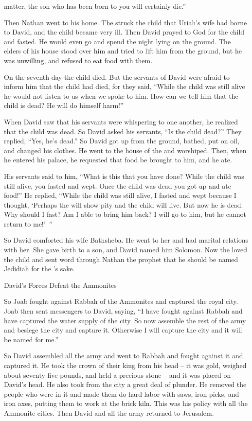 {matter,
the son
who has been born
to you will certainly
die.”
\par }{\PP {}Then Nathan
went
to
his home.
The
{}
struck
the child
that
Uriah’s
wife
had borne
to David,
and the child became very ill.
Then David
prayed
to God
for
the child
and fasted.
He
would even go
and spend
the night lying
on the ground.
The elders
of his house
stood
over
him and tried to lift
him from
the ground,
but he was unwilling,
and refused to eat food
with them.
\par }{\PP {}On
the seventh
day
the child
died.
But the servants
of David
were afraid
to inform
him that
the child
had
died,
for
they said,
“While
the child
was still alive
he would
not
listen
to us when
we spoke to him. How
can we tell
him
that the child
is dead? He will do
himself harm!”
\par }{\PP {}When David
saw
that
his servants
were whispering
to one another, he
realized
that the child
was dead.
So David
asked
his servants,
“Is the child
dead?” They replied,
“Yes, he’s dead.”
So David
got
up from the ground,
bathed,
put on oil,
and changed
his clothes.
He went
to the house
of the {}
and worshiped.
Then, when he entered
his palace,
he requested
that food
be brought to him,
and he ate.
\par }{\PP {}His servants
said
to him,
“What
is this
that
you have done? While
the child
was still alive,
you fasted
and wept.
Once the child
was dead
you got
up and ate
food!”
He replied,
“While
the child
was still alive,
I fasted
and wept
because
I
thought, ‘Perhaps
the {}
will show
pity
and the child
will live.
But now
he is dead.
Why
should I
fast? Am I
able
to bring him back? I
will go
to him,
but he cannot
return
to me!’ ”
\par }{\PP {}So David
comforted
his wife
Bathsheba.
He went
to her
and had marital
relations with
her. She gave birth
to a son,
and David named
him Solomon.
Now the
{}
loved the child
and sent
word through
Nathan
the prophet
that he should be named
Jedidiah
for
the
{}’s
sake.
\par }{\SH David’s Forces Defeat the Ammonites
\par }{\PP {}So Joab
fought
against Rabbah
of the Ammonites
and captured
the royal
city.
Joab
then sent
messengers
to
David,
saying,
“I have fought
against Rabbah
and have
captured
the water
supply of the city.
So now
assemble
the
rest
of the army
and besiege
the city
and capture
it. Otherwise
I
will capture
the city
and it will be named
for me.”
\par }{\PP {}So David
assembled
all
the army
and went
to Rabbah
and fought
against it and captured it.
He took
the
crown
of their king
from his head
– it was gold,
weighed
about seventy-five pounds,
and held a precious
stone
– and it was placed on
David’s
head.
He also took from the city
a great
deal
of plunder.
He removed
the people
who
were in it and made
them do hard labor
with saws,
iron picks,
and iron
axes,
putting
them to work at the brick kiln.
This
was his policy
with all
the Ammonite
cities.
Then David
and all
the army
returned
to Jerusalem.

}
